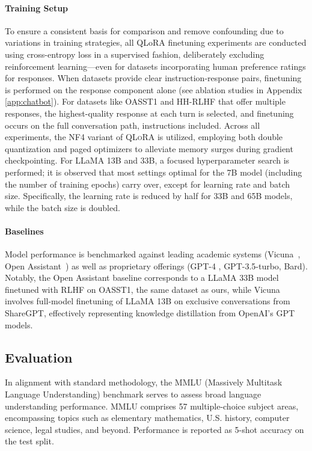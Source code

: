 \paragraph{Training Setup} To ensure a consistent basis for comparison and remove confounding due to variations in training strategies, all QLoRA finetuning experiments are conducted using cross-entropy loss in a supervised fashion, deliberately excluding reinforcement learning—even for datasets incorporating human preference ratings for responses. When datasets provide clear instruction-response pairs, finetuning is performed on the response component alone (see ablation studies in Appendix \ref{app:chatbot}). For datasets like OASST1 and HH-RLHF that offer multiple responses, the highest-quality response at each turn is selected, and finetuning occurs on the full conversation path, instructions included. Across all experiments, the NF4 variant of \textsc{QLoRA} is utilized, employing both double quantization and paged optimizers to alleviate memory surges during gradient checkpointing. For LLaMA 13B and 33B, a focused hyperparameter search is performed; it is observed that most settings optimal for the 7B model (including the number of training epochs) carry over, except for learning rate and batch size. Specifically, the learning rate is reduced by half for 33B and 65B models, while the batch size is doubled.

\paragraph{Baselines} Model performance is benchmarked against leading academic systems (Vicuna~\citep{vicuna2023}, Open Assistant~\citep{kopf2023openassistant}) as well as proprietary offerings (GPT-4 \citep{openai2023gpt}, GPT-3.5-turbo, Bard). Notably, the Open Assistant baseline corresponds to a LLaMA 33B model finetuned with RLHF on OASST1, the same dataset as ours, while Vicuna involves full-model finetuning of LLaMA 13B on exclusive conversations from ShareGPT, effectively representing knowledge distillation from OpenAI's GPT models.

\subsection{Evaluation}

In alignment with standard methodology, the MMLU (Massively Multitask Language Understanding) benchmark \citep{hendrycksmeasuring} serves to assess broad language understanding performance. MMLU comprises 57 multiple-choice subject areas, encompassing topics such as elementary mathematics, U.S. history, computer science, legal studies, and beyond. Performance is reported as 5-shot accuracy on the test split.

